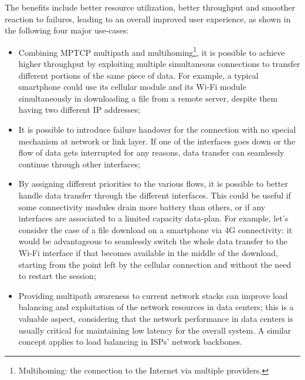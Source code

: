 The benefits include better resource utilization, better throughput and smoother reaction to failures, leading to an overall improved user experience, as shown in the following four major use-cases:
\begin{itemize}
  \item Combining MPTCP multipath and multihoming\footnote{Multihoming: the connection to the Internet via multiple providers.}, it is possible to achieve higher throughput by exploiting multiple simultaneous connections to transfer different portions of the same piece of data. For example, a typical smartphone could use its cellular module and its Wi-Fi module simultaneously in downloading a file from a remote server, despite them having two different IP addresses;
  \item It is possible to introduce failure handover for the connection with no special mechanism at network or link layer. If one of the interfaces goes down or the flow of data gets interrupted for any reasons, data transfer can seamlessly continue through other interfaces;
  \item By assigning different priorities to the various flows, it is possible to better handle data transfer through the different interfaces. This could be useful if some connectivity modules drain more battery than others, or if any interfaces are associated to a limited capacity data-plan. For example, let's consider the case of a file download on a smartphone via 4G connectivity: it would be advantageous to seamlessly switch the whole data transfer to the Wi-Fi interface if that becomes available in the middle of the download, starting from the point left by the cellular connection and without the need to restart the session;
  \item Providing multipath awareness to current network stacks can improve load balancing and exploitation of the network resources in data centers; this is a valuable aspect, considering that the network performance in data centers is usually critical for maintaining low latency for the overall system. A similar concept applies to load balancing in ISPs' network backbones.
\end{itemize}

